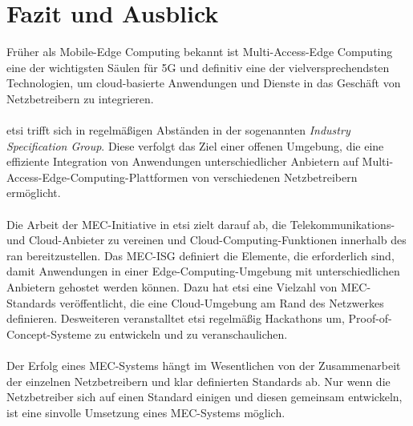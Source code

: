 \documentclass[runningheads]{llncs}
\numberwithin{figure}{section}
\begin{document}
\newpage

\section{Fazit und Ausblick}
Früher als Mobile-Edge Computing bekannt ist Multi-Access-Edge Computing eine der 
wichtigsten Säulen für 5G und definitiv eine der vielversprechendsten Technologien, 
um cloud-basierte Anwendungen und Dienste in das Geschäft von Netzbetreibern zu integrieren.
\\
\\
\acrshort{etsi} trifft sich in regelmäßigen Abständen in der sogenannten \textit{Industry Specification Group}.
Diese verfolgt das Ziel einer
offenen Umgebung, die eine effiziente Integration von Anwendungen unterschiedlicher Anbietern
auf Multi-Access-Edge-Computing-Plattformen von verschiedenen Netzbetreibern ermöglicht.
\\
\\
Die Arbeit der MEC-Initiative in \acrshort{etsi} zielt darauf ab, 
die Telekommunikations- und Cloud-Anbieter zu vereinen 
und Cloud-Computing-Funktionen innerhalb des \acrfull{ran} bereitzustellen. 
Das MEC-ISG definiert die Elemente, die erforderlich sind, 
damit Anwendungen in einer Edge-Computing-Umgebung mit unterschiedlichen Anbietern gehostet werden können.
Dazu hat \acrlong{etsi} eine Vielzahl von MEC- Standards veröffentlicht, die eine Cloud-Umgebung am Rand des 
Netzwerkes definieren. Desweiteren veranstalltet \acrlong{etsi} regelmäßig Hackathons um, Proof-of-Concept-Systeme
zu entwickeln und zu veranschaulichen.
\\
\\
Der Erfolg eines MEC-Systems hängt im Wesentlichen von der Zusammenarbeit der einzelnen Netzbetreibern 
und klar definierten Standards ab. Nur wenn die Netzbetreiber sich auf einen Standard einigen und diesen gemeinsam 
entwickeln, ist eine sinvolle Umsetzung eines MEC-Systems möglich. 



\newpage
%
\printbibliography[heading=bibintoc]
\end{document}
